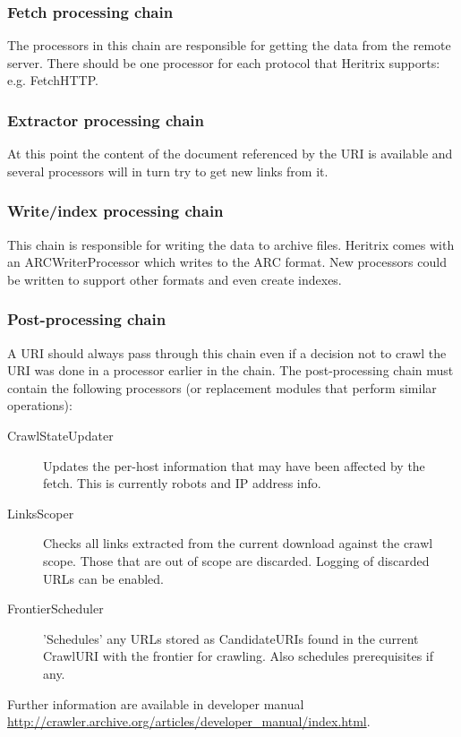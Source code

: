 \documentclass[11pt,a4paper]{article}
\begin{document}
\subsubsection{Fetch processing chain}
The processors in this chain are responsible for getting the data from the remote server. There should be one processor for each protocol that Heritrix supports: e.g. FetchHTTP.

\subsubsection{Extractor processing chain}
At this point the content of the document referenced by the URI is available and several processors will in turn try to get new links from it.

\subsubsection{Write/index processing chain}
This chain is responsible for writing the data to archive files. Heritrix comes with an ARCWriterProcessor which writes to the ARC format. New processors could be written to support other formats and even create indexes.

\subsubsection{Post-processing chain}
A URI should always pass through this chain even if a decision not to crawl the URI was done in a processor earlier in the chain. The post-processing chain must contain the following processors (or replacement modules that perform similar operations):

\begin{description}
\item[CrawlStateUpdater] Updates the per-host information that may have been affected by the fetch. This is currently robots and IP address info.
\item[LinksScoper] Checks all links extracted from the current download against the crawl scope. Those that are out of scope are discarded. Logging of discarded URLs can be enabled.
\item[FrontierScheduler] 'Schedules' any URLs stored as CandidateURIs found in the current CrawlURI with the frontier for crawling. Also schedules prerequisites if any.
\end{description}

Further information are available in developer manual \url{http://crawler.archive.org/articles/developer_manual/index.html}.
\end{document}
